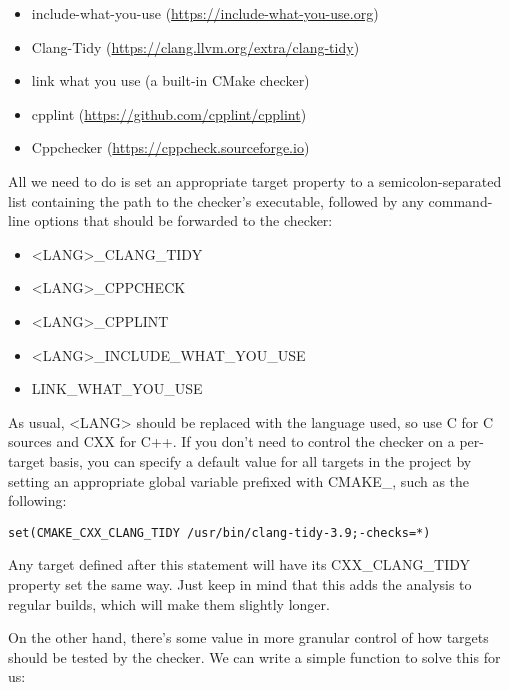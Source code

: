\begin{itemize}
\item 
include-what-you-use (\url{https://include-what-you-use.org})

\item 
Clang-Tidy (\url{https://clang.llvm.org/extra/clang-tidy})

\item 
link what you use (a built-in CMake checker)

\item 
cpplint (\url{https://github.com/cpplint/cpplint})

\item 
Cppchecker (\url{https://cppcheck.sourceforge.io})
\end{itemize}

All we need to do is set an appropriate target property to a semicolon-separated list containing the path to the checker's executable, followed by any command-line options that should be forwarded to the checker:

\begin{itemize}
\item 
<LANG>\_CLANG\_TIDY

\item 
<LANG>\_CPPCHECK

\item 
<LANG>\_CPPLINT

\item 
<LANG>\_INCLUDE\_WHAT\_YOU\_USE

\item 
LINK\_WHAT\_YOU\_USE
\end{itemize}

As usual, <LANG> should be replaced with the language used, so use C for C sources and CXX for C++. If you don't need to control the checker on a per-target basis, you can specify a default value for all targets in the project by setting an appropriate global variable prefixed with CMAKE\_, such as the following:

\begin{lstlisting}[style=styleCMake]
set(CMAKE_CXX_CLANG_TIDY /usr/bin/clang-tidy-3.9;-checks=*)
\end{lstlisting}

Any target defined after this statement will have its CXX\_CLANG\_TIDY property set the same way. Just keep in mind that this adds the analysis to regular builds, which will make them slightly longer.

On the other hand, there's some value in more granular control of how targets should be tested by the checker. We can write a simple function to solve this for us:

